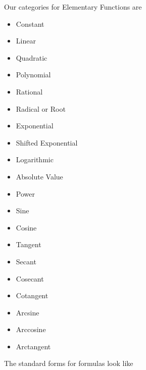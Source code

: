 \documentclass{ximera}
\begin{document}
Our categories for Elementary Functions are

\begin{itemize}
    \item Constant
    \item Linear
    \item Quadratic
    \item Polynomial
    \item Rational
    \item Radical or Root
    \item Exponential
    \item Shifted Exponential 
    \item Logarithmic
    \item Absolute Value
    \item Power
    \item Sine
    \item Cosine
    \item Tangent
    \item Secant
    \item Cosecant
    \item Cotangent
    \item Arcsine
    \item Arccosine
    \item Arctangent
\end{itemize} 





The standard forms for formulas look like
\end{document}
